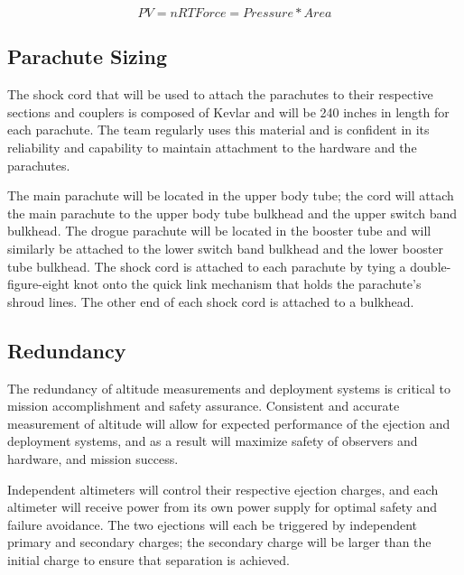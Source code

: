 \begin{equation}
PV = nRT
Force = Pressure* Area
\end{equation}

    \subsection{Parachute Sizing}
The shock cord that will be used to attach the parachutes to their respective sections and couplers is composed of Kevlar and will be 240 inches in length for each parachute. The team regularly uses this material and is confident in its reliability and capability to maintain attachment to the hardware and the parachutes.

The main parachute will be located in the upper body tube; the cord will attach the main parachute to the upper body tube bulkhead and the upper switch band bulkhead. The drogue parachute will be located in the booster tube and will similarly be attached to the lower switch band bulkhead and the lower booster tube bulkhead. The shock cord is attached to each parachute by tying a double-figure-eight knot onto the quick link mechanism that holds the parachute’s shroud lines. The other end of each shock cord is attached to a bulkhead. 

    

    \subsection{Redundancy}
The redundancy of altitude measurements and deployment systems is critical to mission accomplishment and safety assurance. Consistent and accurate measurement of altitude will allow for expected performance of the ejection and deployment systems, and as a result will maximize safety of observers and hardware, and mission success.

Independent altimeters will control their respective ejection charges, and each altimeter will receive power from its own power supply for optimal safety and failure avoidance. The two ejections will each be triggered by independent primary and secondary charges; the secondary charge will be larger than the initial charge to ensure that separation is achieved. 
